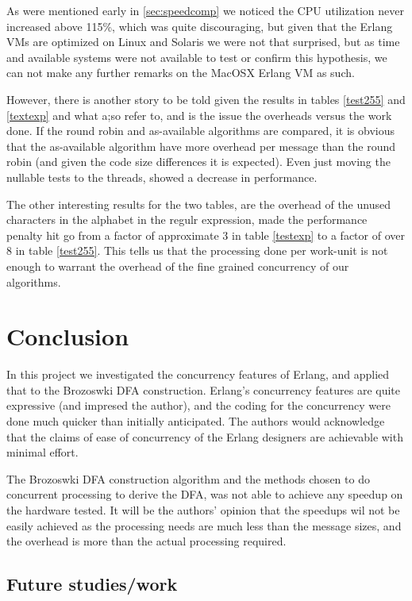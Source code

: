 \documentclass[a4paper,11pt]{report}
\begin{document}
As were mentioned early in \ref{sec:speedcomp} we noticed the CPU
utilization never increased above 115\%, which was quite discouraging,
but given that the Erlang VMs are optimized on Linux and Solaris we
were not that surprised, but as time and available systems were
not available to test or confirm this hypothesis, we can not make any
further remarks on the MacOSX Erlang VM as such.

However, there is another story to be told given the results in tables
\ref{test255} and \ref{textexp} and what \cite{armstrong} a;so refer
to, and is the issue the overheads versus the work
done. If the round robin and as-available algorithms are compared, it
is obvious that the as-available algorithm have more overhead per
message than the round robin (and given the code size differences it
is expected). Even just moving the nullable tests to the threads,
showed a decrease in performance.

The other interesting results for the two tables, are the overhead of
the unused characters in the alphabet in the regulr expression, made
the performance penalty hit go from a factor of approximate 3 in table
\ref{testexp} to a factor of over 8 in table \ref{test255}.  This
tells us that the processing done per work-unit is not enough to
warrant the overhead of the fine grained concurrency of our
algorithms.

\chapter{Conclusion}


In this project we investigated the concurrency features of Erlang,
and applied that to the Brozoswki DFA construction. Erlang's
concurrency features are quite expressive (and impresed the author),
and the coding for the concurrency were done much quicker than
initially anticipated. The authors would acknowledge that the claims of
ease of concurrency of the Erlang designers are achievable with
minimal effort.

The Brozoswki DFA construction algorithm and the methods chosen to do
concurrent processing to derive the DFA, was not able to achieve any
speedup on the hardware tested. It will be the authors' opinion that
the speedups wil not be easily achieved as the processing needs are
much less than the message sizes, and the overhead is more than the
actual processing required. 

\section{Future studies/work }
\end{document}
